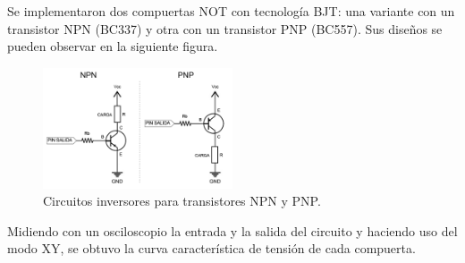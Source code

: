 


Se implementaron dos compuertas NOT con tecnología BJT: una variante con un transistor NPN (BC337) y otra con un transistor PNP (BC557). Sus diseños se pueden observar en la siguiente figura.


\begin{figure}[H]
  \centering
    \includegraphics[width=0.5\textwidth]{ejercicio1/circuitos.png}
    \caption{Circuitos inversores para transistores NPN y PNP.}
\end{figure}

Midiendo con un osciloscopio la entrada y la salida del circuito y haciendo uso del modo XY, se obtuvo la curva caracter\'istica de tensi\'on de cada compuerta.

